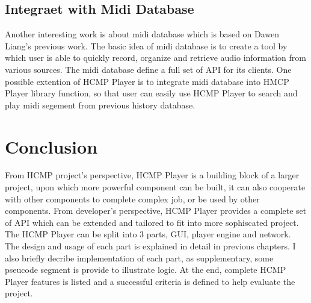 \subsection{Integraet with Midi Database}
Another interesting work is about midi database\cite{Dawen:ISMIR2011} which 
is based on Dawen Liang's previous work. The basic idea of midi database 
is to create a tool by which user is able to quickly record, organize
and retrieve audio information from various sources. The midi database 
define a full set of API for its clients. One possible extention of HCMP 
Player is to integrate midi database into HMCP Player library function, 
so that user can easily use HCMP Player to search and play midi 
segement from previous history database.

\section{Conclusion}
From HCMP project's perspective, HCMP Player is a building block of a larger
project, upon which more powerful component can be built, it can also 
cooperate with other components to complete complex job, or be used by other
components. From developer's 
perspective, HCMP Player provides a complete set of API which can be extended 
and tailored to fit into more sophiscated project.
The HCMP Player can be split into 3 parts,  
GUI, player engine and network. The design and usage of each part 
is explained in detail in previous chapters. I also briefly decribe 
implementation of each part, as supplementary,
some pseucode segment is provide to illustrate logic. At the end, complete 
HCMP Player features is listed and a successful criteria is defined to
help evaluate the project.
